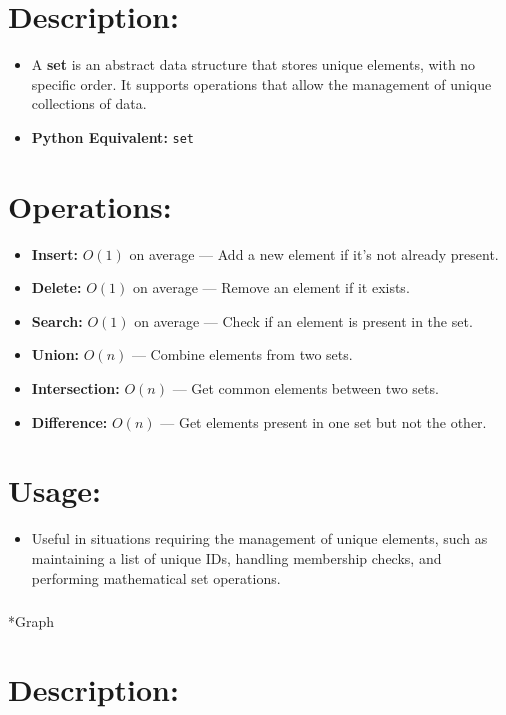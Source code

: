\documentclass[
  letterpaper,
  DIV=11,
  numbers=noendperiod]{scrreprt}
\makeatletter
\let\oldsubparagraph\subparagraph
\renewcommand{\subparagraph}{
    \@ifstar
      \xxxSubParagraphStar
      \xxxSubParagraphNoStar
  }
\newcommand{\xxxSubParagraphStar}[1]{\oldsubparagraph*{#1}\mbox{}}
\newcommand{\xxxSubParagraphNoStar}[1]{\oldsubparagraph{#1}\mbox{}}
\providecommand{\tightlist}{%
  \setlength{\itemsep}{0pt}\setlength{\parskip}{0pt}}
\makeatother
\begin{document}
\section{Description:}

\begin{itemize}
\tightlist
\item
  A \textbf{set} is an abstract data structure that stores unique
  elements, with no specific order. It supports operations that allow
  the management of unique collections of data.
\item
  \textbf{Python Equivalent:} \texttt{set}
\end{itemize}

\section{Operations:}

\begin{itemize}
\tightlist
\item
  \textbf{Insert:} \(O(1)\) on average --- Add a new element if it's not
  already present.
\item
  \textbf{Delete:} \(O(1)\) on average --- Remove an element if it
  exists.
\item
  \textbf{Search:} \(O(1)\) on average --- Check if an element is
  present in the set.
\item
  \textbf{Union:} \(O(n)\) --- Combine elements from two sets.
\item
  \textbf{Intersection:} \(O(n)\) --- Get common elements between two
  sets.
\item
  \textbf{Difference:} \(O(n)\) --- Get elements present in one set but
  not the other.
\end{itemize}

\section{Usage:}

\begin{itemize}
\tightlist
\item
  Useful in situations requiring the management of unique elements, such
  as maintaining a list of unique IDs, handling membership checks, and
  performing mathematical set operations.
\end{itemize}

\subparagraph*{Graph}\label{graph}

\section{Description:}
\end{document}
